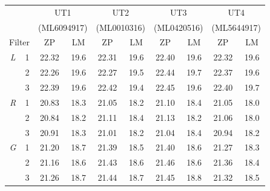 \begin{colsection}
\begin{colsection}
\begin{table}[p]
    \begin{center}
        \begin{tabular}{cc|cc|cc|cc|cc} %
             & &
            \multicolumn{2}{c|}{UT1} &
            \multicolumn{2}{c|}{UT2} &
            \multicolumn{2}{c|}{UT3} &
            \multicolumn{2}{c}{UT4}
            \\
             & &
            \multicolumn{2}{c|}{{\footnotesize(ML6094917)}} &
            \multicolumn{2}{c|}{{\footnotesize(ML0010316)}} &
            \multicolumn{2}{c|}{{\footnotesize(ML0420516)}} &
            \multicolumn{2}{c}{{\footnotesize(ML5644917)}}
            \\
            \multicolumn{2}{c|}{Filter} &
            ZP & LM & ZP & LM & ZP & LM & ZP & LM \\
            \midrule
            \textit{L} & 1 &
            22.32 & 19.6 &
            22.31 & 19.6 &
            22.40 & 19.6 &
            22.32 & 19.6
            \\
            & 2 &
            22.26 & 19.6 &
            22.27 & 19.5 &
            22.44 & 19.7 &
            22.37 & 19.6
            \\
            & 3 &
            22.39 & 19.6 &
            22.42 & 19.4 &
            22.45 & 19.6 &
            22.40 & 19.7
            \\
            \midrule
            \textit{R} & 1 &
            20.83 & 18.3 &
            21.05 & 18.2 &
            21.10 & 18.4 &
            21.05 & 18.0
            \\
            & 2 &
            20.84 & 18.2 &
            21.11 & 18.4 &
            21.13 & 18.2 &
            21.06 & 18.0
            \\
            & 3 &
            20.91 & 18.3 &
            21.01 & 18.2 &
            21.04 & 18.4 &
            20.94 & 18.2
            \\
            \midrule
            \textit{G} & 1 &
            21.20 & 18.7 &
            21.39 & 18.5 &
            21.40 & 18.6 &
            21.27 & 18.3
            \\
            & 2 &
            21.16 & 18.6 &
            21.43 & 18.6 &
            21.46 & 18.6 &
            21.36 & 18.4
            \\
            & 3 &
            21.26 & 18.7 &
            21.44 & 18.7 &
            21.45 & 18.8 &
            21.32 & 18.5
            \\
            \midrule

\end{tabular}
\end{center}
\end{table}
\end{colsection}
\end{colsection}

